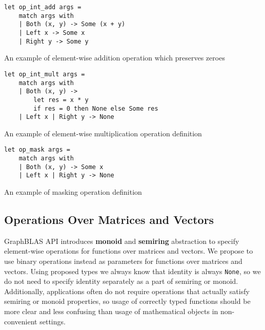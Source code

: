 \begin{listing}[h]
    \begin{verbatim}
let op_int_add args =
    match args with
    | Both (x, y) -> Some (x + y) 
    | Left x -> Some x
    | Right y -> Some y
    \end{verbatim}
    \caption{An example of element-wise addition operation which preserves zeroes}
    \label{lst:opIntAdd_Zero}
\end{listing}


\begin{listing}[h]
    \begin{verbatim}
let op_int_mult args =
    match args with
    | Both (x, y) -> 
        let res = x * y 
        if res = 0 then None else Some res 
    | Left x | Right y -> None
    \end{verbatim}
    \caption{An example of element-wise multiplication operation definition}
    \label{lst:opIntMult}
\end{listing}

\begin{listing}[h]
    \begin{verbatim}
let op_mask args =
    match args with
    | Both (x, y) -> Some x
    | Left x | Right y -> None
    \end{verbatim}
    \caption{An example of masking operation definition}
    \label{lst:opMask}
\end{listing}

\subsection{Operations Over Matrices and Vectors}

GraphBLAS API introduces \textbf{monoid} and \textbf{semiring} abstraction to specify element-wise operations for functions over matrices and vectors.
We propose to use binary operations instead as parameters for functions over matrices and vectors.
Using proposed types we always know that identity is always \texttt{None}, so we do not need to specify identity separately as a part of semiring or monoid.
Additionally, applications often do not require operations that actually satisfy semiring or monoid properties, so usage of correctly typed functions should be more clear and less confusing than usage of mathematical objects in non-convenient settings.

